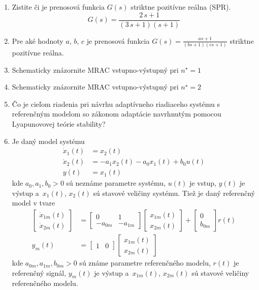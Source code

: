 \documentclass[a4paper, 10pt, ]{article}
\begin{document}
\begin{enumerate}[leftmargin=0pt, labelsep=4mm, itemsep=0pt]
	\item Zistite či je prenosová funkcia $G(s)$ striktne pozitívne reálna (SPR).
	\begin{equation*}
		G(s) = \frac{2\,s + 1}{ (3\,s + 1) (s + 1)}
	\end{equation*}

	\item Pre aké hodnoty $a$, $b$, $c$ je prenosová funkcia $\displaystyle G(s) = \frac{as + 1}{ \left( bs + 1 \right)   \left( cs + 1 \right)   }$ striktne pozitívne reálna.


	\item Schematicky znázornite MRAC vstupno-výstupný pri $n^\star = 1$

	\item Schematicky znázornite MRAC vstupno-výstupný pri $n^\star = 2$

	\item Čo je cieľom riadenia pri návrhu adaptívneho riadiaceho systému s referenčným modelom so zákonom adaptácie navrhnutým pomocou Lyapunovovej teórie stability?


	\item Je daný model systému
	\begin{align*}
		\dot{x}_1(t) &= x_2(t) \\
		\dot{x}_2(t) &= -a_1 x_2(t) - a_0 x_1(t) + b_0 u(t) \\
		y(t) & = x_1(t)
	\end{align*}
	kde $a_0, a_1, b_0 > 0$ sú neznáme parametre systému, $u(t)$ je vstup, $y(t)$ je výstup a~$x_1(t)$, $x_2(t)$ sú stavové veličiny systému. Tiež je daný referenčný model v tvare
	\begin{align*}
		\begin{bmatrix} \dot{x}_{1m}(t) \\ \dot{x}_{2m}(t) \end{bmatrix}
        &=
		\begin{bmatrix} 0 & 1 \\ -a_{0m} & -a_{1m} \end{bmatrix}
		\begin{bmatrix} x_{1m}(t)  \\ x_{2m}(t) \end{bmatrix}
		+
		\begin{bmatrix} 0  \\  b_{0m} \end{bmatrix}
		r(t) \\
		y_m(t) &= \begin{bmatrix} 1 & 0 \end{bmatrix} \begin{bmatrix} x_{1m}(t)  \\ x_{2m}(t) \end{bmatrix}
	\end{align*}
	kde $a_{0m}, a_{1m}, b_{0m} > 0$ sú známe parametre referenčného modelu, $r(t)$ je referenčný signál, $y_m(t)$ je výstup a~$x_{1m}(t)$, $x_{2m}(t)$ sú stavové veličiny referenčného modelu.


\end{enumerate}
\end{document}
